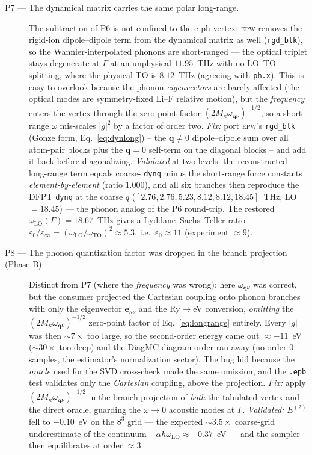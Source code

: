 \documentclass[11pt]{article}
\newcommand{\qv}{\mathbf{q}}
\begin{document}
\begin{description}
  \item[P7 --- The dynamical matrix carries the same polar long-range.]
    The subtraction of P6 is not confined to the e-ph vertex: \textsc{epw} removes the
    rigid-ion dipole--dipole term from the dynamical matrix as well (\texttt{rgd\_blk}), so
    the Wannier-interpolated phonons are short-ranged --- the optical triplet stays
    degenerate at $\Gamma$ at an unphysical $11.95$~THz with no LO--TO splitting, where the
    physical TO is $8.12$~THz (agreeing with \texttt{ph.x}). This is easy to overlook because
    the phonon \emph{eigenvectors} are barely affected (the optical modes are symmetry-fixed
    Li--F relative motion), but the \emph{frequency} enters the vertex through the zero-point
    factor $(2M_{\kappa}\omega_{\qv\nu})^{-1/2}$, so a short-range $\omega$ mis-scales
    $|g|^{2}$ by a factor of order two.
    \emph{Fix:} port \textsc{epw}'s \texttt{rgd\_blk} (Gonze form, Eq.~\eqref{eq:dynlong}) --
    the $\qv\neq0$ dipole--dipole sum over all atom-pair blocks plus the $\qv{=}0$ self-term
    on the diagonal blocks -- and add it back before diagonalizing.
    \emph{Validated} at two levels: the reconstructed long-range term equals coarse-%
    \texttt{dynq} minus the short-range force constants \emph{element-by-element} (ratio
    $1.000$), and all six branches then reproduce the DFPT \texttt{dynq} at the coarse $q$
    ($[2.76,2.76,5.23,8.12,8.12,18.45]$~THz, LO $=18.45$) --- the phonon analog of the P6
    round-trip. The restored $\omega_{\mathrm{LO}}(\Gamma)=18.67$~THz gives a
    Lyddane--Sachs--Teller ratio $\varepsilon_{0}/\varepsilon_{\infty}=
    (\omega_{\mathrm{LO}}/\omega_{\mathrm{TO}})^{2}\approx5.3$, i.e.\ $\varepsilon_{0}\approx11$
    (experiment $\approx9$).

  \item[P8 --- The phonon quantization factor was dropped in the branch projection
    (Phase B).]
    Distinct from P7 (where the \emph{frequency} was wrong): here $\omega_{\qv\nu}$ was
    correct, but the consumer projected the Cartesian coupling onto phonon branches with only
    the eigenvector $\mathbf{e}_{\kappa\nu}$ and the Ry$\to$eV conversion, \emph{omitting} the
    $(2M_{\kappa}\omega_{\qv\nu})^{-1/2}$ zero-point factor of Eq.~\eqref{eq:longrange}
    entirely. Every $|g|$ was then $\sim\!7\times$ too large, so the second-order energy came
    out $\approx-11$~eV ($\sim\!30\times$ too deep) and the DiagMC diagram order ran away (no
    order-$0$ samples, the estimator's normalization sector). The bug hid because the
    \emph{oracle} used for the SVD cross-check made the same omission, and the \texttt{.epb}
    test validates only the \emph{Cartesian} coupling, above the projection.
    \emph{Fix:} apply $(2M_{\kappa}\omega_{\qv\nu})^{-1/2}$ in the branch projection of
    \emph{both} the tabulated vertex and the direct oracle, guarding the $\omega\to0$ acoustic
    modes at $\Gamma$. \emph{Validated:} $E^{(2)}$ fell to $-0.10$~eV on the $8^{3}$ grid ---
    the expected $\sim\!3.5\times$ coarse-grid underestimate of the continuum
    $-\alpha\hbar\omega_{\mathrm{LO}}\approx-0.37$~eV --- and the sampler then equilibrates at
    order $\approx3$.


\end{description}
\end{document}

